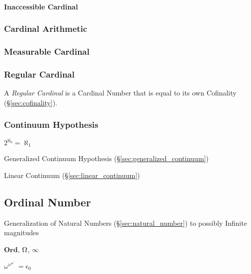 \paragraph{Inaccessible Cardinal}\label{sec:inaccessible_cardinal}\hfill



\subsubsection{Cardinal Arithmetic}\label{sec:cardinal_arithmetic}

\subsubsection{Measurable Cardinal}\label{sec:measurable_cardinal}

\subsubsection{Regular Cardinal}\label{sec:regular_cardinal}

A \emph{Regular Cardinal} is a Cardinal Number that is equal to its
own Cofinality (\S\ref{sec:cofinality}).



\subsubsection{Continuum Hypothesis}\label{sec:continuum_hypothesis}

$2^{\aleph_0} = \aleph_1$

Generalized Continuum Hypothesis (\S\ref{sec:generalized_continuum})

Linear Continuum (\S\ref{sec:linear_continuum})



\subsection{Ordinal Number}\label{sec:ordinal_number}

Generalization of Natural Numbers (\S\ref{sec:natural_number}) to
possibly Infinite magnitudes %

$\mathbf{Ord}$, $\Omega$, $\infty$

$\omega^{\omega^{\omega^{\cdots}}} = \epsilon_0$

